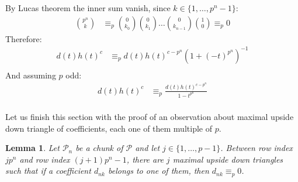 \documentclass[11pt,a4paper]{article} %
\newtheorem{lemma}[theorem]{Lemma}
\begin{document}
    By Lucas theorem the inner sum vanish, since $k\in\lbrace 1, \ldots, p^n -1 \rbrace$:
      \begin{displaymath}
        \begin{split}
          {{p^n} \choose {k}} &\equiv_{p} {{0} \choose {k_0}} {{0} \choose {k_1}} \ldots 
          {{0} \choose {k_{n-1}}}{{1} \choose {0}}\equiv_{p} 0 
        \end{split}
      \end{displaymath}
    Therefore:
      \begin{displaymath}
          \begin{split}
                d(t)h(t)^{c} &\equiv_p d(t)h(t)^{c-p^n}\left(1 + (-t)^{p^n}\right)^{-1} \\
          \end{split}
      \end{displaymath}
    And assuming $p$ odd:
      \begin{displaymath}
          \begin{split}
                d(t)h(t)^{c} &\equiv_p \frac{d(t)h(t)^{c-p^n}}{1 - t^{p^n}} \\
          \end{split}
      \end{displaymath}

    Let us finish this section with the proof of an observation about
    maximal upside down triangle of coefficients, each one of them 
    multiple of $p$.

    \begin{lemma}
        Let $\mathcal{P}_n$ be a chunk of $\mathcal{P}$ and let $j\in
        \lbrace 1, \ldots, p-1 \rbrace$. Between row index $j p^n$ and
        row index $(j+1)p^n -1$, there are $j$ maximal upside down triangles
        such that if a coefficient $d_{nk}$ belongs to one of them, then 
        $d_{nk} \equiv_{p} 0$.
    \end{lemma}
\end{document}

